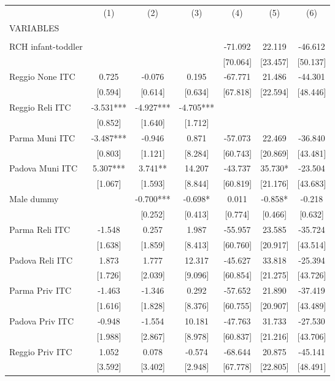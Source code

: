 \begin{tabular}{lcccccc} \hline
 & (1) & (2) & (3) & (4) & (5) & (6) \\
VARIABLES &  &  &  &  &  &  \\ \hline
 &  &  &  &  &  &  \\
RCH infant-toddler &  &  &  & -71.092 & 22.119 & -46.612 \\
 &  &  &  & [70.064] & [23.457] & [50.137] \\
Reggio None ITC & 0.725 & -0.076 & 0.195 & -67.771 & 21.486 & -44.301 \\
 & [0.594] & [0.614] & [0.634] & [67.818] & [22.594] & [48.446] \\
Reggio Reli ITC & -3.531*** & -4.927*** & -4.705*** &  &  &  \\
 & [0.852] & [1.640] & [1.712] &  &  &  \\
Parma Muni ITC & -3.487*** & -0.946 & 0.871 & -57.073 & 22.469 & -36.840 \\
 & [0.803] & [1.121] & [8.284] & [60.743] & [20.869] & [43.481] \\
Padova Muni ITC & 5.307*** & 3.741** & 14.207 & -43.737 & 35.730* & -23.504 \\
 & [1.067] & [1.593] & [8.844] & [60.819] & [21.176] & [43.683] \\
Male dummy &  & -0.700*** & -0.698* & 0.011 & -0.858* & -0.218 \\
 &  & [0.252] & [0.413] & [0.774] & [0.466] & [0.632] \\
Parma Reli ITC & -1.548 & 0.257 & 1.987 & -55.957 & 23.585 & -35.724 \\
 & [1.638] & [1.859] & [8.413] & [60.760] & [20.917] & [43.514] \\
Padova Reli ITC & 1.873 & 1.777 & 12.317 & -45.627 & 33.818 & -25.394 \\
 & [1.726] & [2.039] & [9.096] & [60.854] & [21.275] & [43.726] \\
Parma Priv ITC & -1.463 & -1.346 & 0.292 & -57.652 & 21.890 & -37.419 \\
 & [1.616] & [1.828] & [8.376] & [60.755] & [20.907] & [43.489] \\
Padova Priv ITC & -0.948 & -1.554 & 10.181 & -47.763 & 31.733 & -27.530 \\
 & [1.988] & [2.867] & [8.978] & [60.837] & [21.216] & [43.706] \\
Reggio Priv ITC & 1.052 & 0.078 & -0.574 & -68.644 & 20.875 & -45.141 \\
 & [3.592] & [3.402] & [2.948] & [67.778] & [22.805] & [48.491] \\

\end{tabular}
